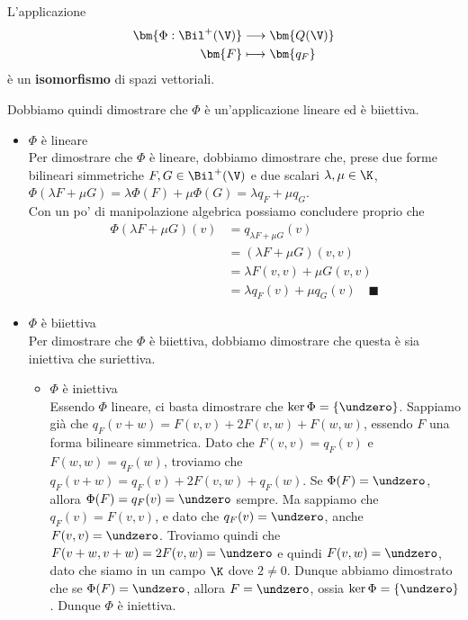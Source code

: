 \documentclass[11pt, a4paper, titlepage, oneside]{scrbook}
\begin{document}
\begin{Proposizione}[]
\label{propos-isomorfismo-bilineari-quadratiche}
L'applicazione
\begin{align*}
\bm{\Phi: \Bil^+(\V)} &\longrightarrow \bm{Q(\V)}  \\
\bm{F} &\longmapsto \bm{q_F} 
\end{align*}
è un \textbf{isomorfismo} di spazi vettoriali.
\end{Proposizione}

\Dimostrazione \nopagebreak

Dobbiamo quindi dimostrare che $\Phi$ è un'applicazione lineare ed è biiettiva.

\begin{itemize}
    \item $\Phi$ è lineare \\
    Per dimostrare che $\Phi$ è lineare, dobbiamo dimostrare che, prese due forme bilineari simmetriche $F,G \in \Bil^+(\V)$ e due scalari $\lambda, \mu \in \K$, $\Phi(\lambda F + \mu G) = \lambda \Phi(F) + \mu \Phi(G) = \lambda q_F + \mu q_G$. \\
    Con un po' di manipolazione algebrica possiamo concludere proprio che
    \begin{align*}
    \Phi(\lambda F + \mu G)(v) &= q_{\lambda F + \mu G}(v) \\
     &= (\lambda F + \mu G)(v,v) \\
     &= \lambda F (v,v) + \mu G(v,v) \\
     &=  \lambda q_F(v) + \mu q_G(v) \quad \blacksquare
    \end{align*}
    \item $\Phi$ è biiettiva \\
    Per dimostrare che $\Phi$ è biiettiva, dobbiamo dimostrare che questa è sia iniettiva che suriettiva.
    \begin{itemize}
        \item $\Phi$ è iniettiva \\
        Essendo $\Phi$ lineare, ci basta dimostrare che $\ker \Phi = \{\undzero\}$. Sappiamo già che \mbox{$q_F(v+w) = F(v,v) + 2F(v,w) + F(w,w)$}, essendo $F$ una forma bilineare simmetrica. Dato che $F(v,v) = q_F(v)$ e $F(w,w) = q_F(w)$, troviamo che $q_F(v+w) = q_F(v) + 2F(v,w) + q_F(w)$. Se $\Phi(F) = \undzero$, allora $\Phi(F) = q_F(v) = \undzero$ sempre. Ma sappiamo che $q_F(v) = F(v,v)$, e dato che $q_F(v) = \undzero$, anche $F(v,v) = \undzero$. Troviamo quindi che $F(v+w,v+w) = 2F(v,w) = \undzero$ e quindi $F(v,w) = \undzero$, dato che siamo in un campo $\K$ dove $2 \neq 0$. Dunque abbiamo dimostrato che se $\Phi(F) = \undzero$, allora $F = \undzero$, ossia $\ker \Phi = \{\undzero\}$. Dunque $\Phi$ è iniettiva.

\end{itemize}
\end{itemize}
\end{document}
